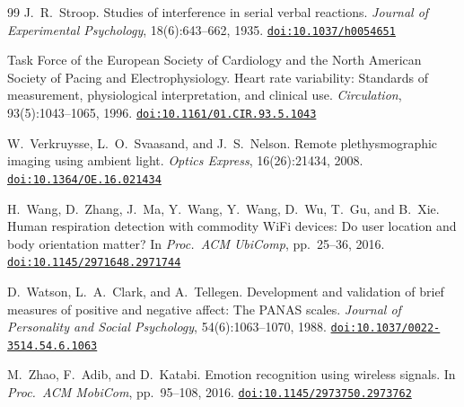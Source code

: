 \documentclass[11pt,a4paper]{article}
\newcommand{\doi}[1]{\href{https://doi.org/#1}{\nolinkurl{doi:#1}}}
\begin{document}
\begin{thebibliography}{99}
 J.~R.~Stroop. Studies of interference in serial verbal reactions. \emph{Journal of Experimental
Psychology}, 18(6):643--662, 1935. \doi{10.1037/h0054651}

 Task Force of the European Society of Cardiology and the North American Society of Pacing and
Electrophysiology. Heart rate variability: Standards of measurement, physiological interpretation, and clinical
use. \emph{Circulation}, 93(5):1043--1065, 1996. \doi{10.1161/01.CIR.93.5.1043}

 W.~Verkruysse, L.~O.~Svaasand, and J.~S.~Nelson. Remote plethysmographic imaging using
ambient light. \emph{Optics Express}, 16(26):21434, 2008. \doi{10.1364/OE.16.021434}

 H.~Wang, D.~Zhang, J.~Ma, Y.~Wang, Y.~Wang, D.~Wu, T.~Gu, and B.~Xie. Human respiration
detection with commodity WiFi devices: Do user location and body orientation matter? In \emph{Proc.\ ACM UbiComp},
pp.~25--36, 2016. \doi{10.1145/2971648.2971744}

 D.~Watson, L.~A.~Clark, and A.~Tellegen. Development and validation of brief measures of
positive and negative affect: The PANAS scales. \emph{Journal of Personality and Social Psychology},
54(6):1063--1070, 1988. \doi{10.1037/0022-3514.54.6.1063}

 M.~Zhao, F.~Adib, and D.~Katabi. Emotion recognition using wireless signals. In \emph{Proc.\ ACM
MobiCom}, pp.~95--108, 2016. \doi{10.1145/2973750.2973762}

\end{thebibliography}
\end{document}
